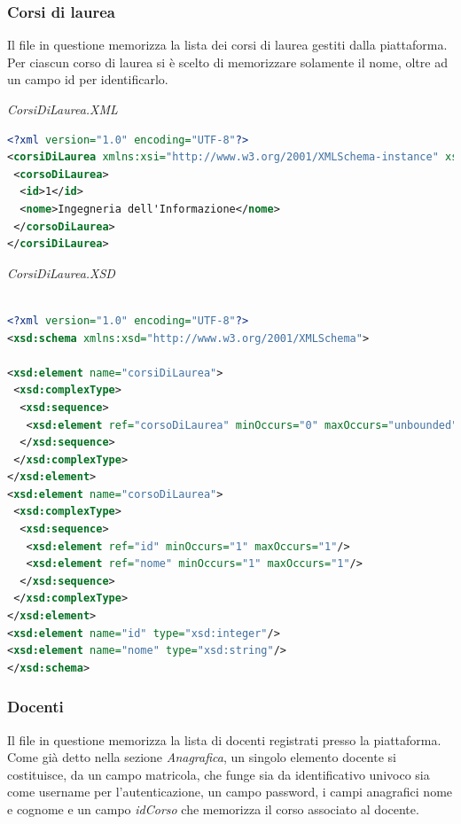 \documentclass [a4paper,11pt]{book}
\begin{document}
\medskip

\subsubsection{Corsi di laurea}

Il file in questione memorizza la lista dei corsi di laurea gestiti dalla piattaforma. Per ciascun corso di laurea si è scelto di memorizzare solamente il nome, oltre ad un campo id per identificarlo.

\medskip

\emph{CorsiDiLaurea.XML}

\begin{lstlisting}[language=XML]
<?xml version="1.0" encoding="UTF-8"?>
<corsiDiLaurea xmlns:xsi="http://www.w3.org/2001/XMLSchema-instance" xsi:noNamespaceSchemaLocation="corsiDiLaurea.xsd">
 <corsoDiLaurea>
  <id>1</id>
  <nome>Ingegneria dell'Informazione</nome>
 </corsoDiLaurea>
</corsiDiLaurea>
\end{lstlisting}

\medskip

\emph{CorsiDiLaurea.XSD}

\begin{lstlisting}[language=XML]

<?xml version="1.0" encoding="UTF-8"?>
<xsd:schema xmlns:xsd="http://www.w3.org/2001/XMLSchema">

<xsd:element name="corsiDiLaurea">
 <xsd:complexType>
  <xsd:sequence>
   <xsd:element ref="corsoDiLaurea" minOccurs="0" maxOccurs="unbounded" />
  </xsd:sequence>
 </xsd:complexType>
</xsd:element>
<xsd:element name="corsoDiLaurea">
 <xsd:complexType>
  <xsd:sequence>
   <xsd:element ref="id" minOccurs="1" maxOccurs="1"/>
   <xsd:element ref="nome" minOccurs="1" maxOccurs="1"/>
  </xsd:sequence>
 </xsd:complexType>
</xsd:element>
<xsd:element name="id" type="xsd:integer"/>
<xsd:element name="nome" type="xsd:string"/>
</xsd:schema>
\end{lstlisting}

\medskip

\subsubsection{Docenti}

Il file in questione memorizza la lista di docenti registrati presso la piattaforma. Come già detto nella sezione \emph{Anagrafica}, un singolo elemento docente si costituisce, da un campo matricola, che funge sia da identificativo univoco sia come username per l'autenticazione, un campo password, i campi anagrafici nome e cognome e un campo \emph{idCorso} che memorizza il corso associato al docente.
\end{document}
